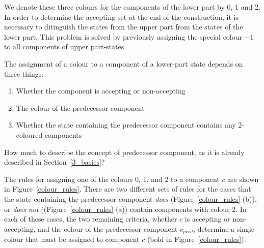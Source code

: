 We denote these three colours for the components of the lower part by 0, 1 and 2. In order to determine the accepting set at the end of the construction, it is necessary to ditinguish the states from the upper part from the states of the lower part. This problem is solved by previously assigning the special colour $-1$ to all components of upper part-states.

The assignment of a colour to a component of a lower-part state depends on three things:
\begin{enumerate}
\item Whether the component is accepting or non-accepting
\item The colour of the predecessor component
\item Whether the state containing the predecessor component contains any 2-coloured components
\end{enumerate}

How much to describe the concept of predecessor component, as it is already described in Section~\ref{3_basics}?

The rules for assigning one of the colours 0, 1, and 2 to a component $c$ are shown in Figure~\ref{colour_rules}. There are two different sets of rules for the cases that the state containing the predecessor component \textit{does} (Figure~\ref{colour_rules} (b)), or \textit{does not} ((Figure~\ref{colour_rules} (a)) contain components with colour 2. In each of these cases, the two remaining criteria, whether $c$ is accepting or non-accepting, and the colour of the predecessor component $c_{pred}$, determine a single colour that must be assigned to component $c$ (bold in Figure~\ref{colour_rules}). 

